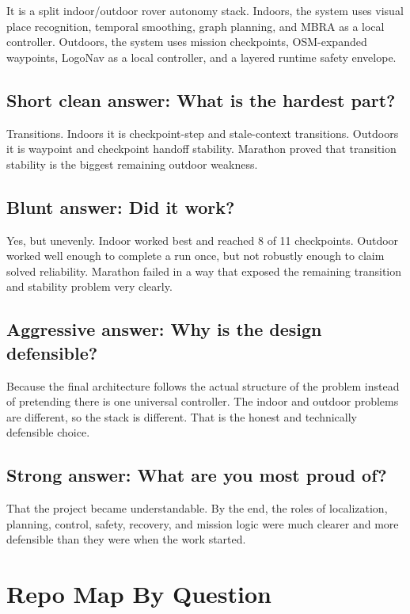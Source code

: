 \documentclass[11pt]{article}
\begin{document}
It is a split indoor/outdoor rover autonomy stack. Indoors, the system uses visual
place recognition, temporal smoothing, graph planning, and MBRA as a local
controller. Outdoors, the system uses mission checkpoints, OSM-expanded waypoints,
LogoNav as a local controller, and a layered runtime safety envelope.

\subsection{Short clean answer: What is the hardest part?}

Transitions. Indoors it is checkpoint-step and stale-context transitions. Outdoors
it is waypoint and checkpoint handoff stability. Marathon proved that transition
stability is the biggest remaining outdoor weakness.

\subsection{Blunt answer: Did it work?}

Yes, but unevenly. Indoor worked best and reached 8 of 11 checkpoints. Outdoor
worked well enough to complete a run once, but not robustly enough to claim solved
reliability. Marathon failed in a way that exposed the remaining transition and
stability problem very clearly.

\subsection{Aggressive answer: Why is the design defensible?}

Because the final architecture follows the actual structure of the problem instead
of pretending there is one universal controller. The indoor and outdoor problems are
different, so the stack is different. That is the honest and technically defensible
choice.

\subsection{Strong answer: What are you most proud of?}

That the project became understandable. By the end, the roles of localization,
planning, control, safety, recovery, and mission logic were much clearer and more
defensible than they were when the work started.

\section{Repo Map By Question}
\end{document}
